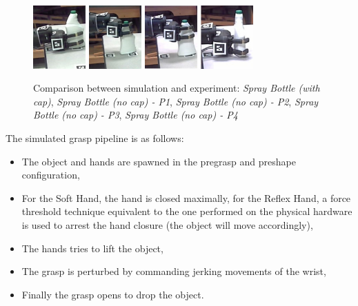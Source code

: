 \begin{figure}[!!hbt]
\begin{center}
{ \includegraphics[width=0.18\textwidth]     {images/ssoch/fig/spray_p1}    \label{spray_p1}}
{ \includegraphics[width=0.18\textwidth]     {images/ssoch/fig/spray_p2}    \label{spray_p2}}
{ \includegraphics[width=0.18\textwidth]     {images/ssoch/fig/spray_p3}    \label{spray_p3}}
{ \includegraphics[width=0.18\textwidth]     {images/ssoch/fig/spray_p4}    \label{spray_p4}}
        \caption{Comparison between simulation and experiment: \emph{Spray Bottle (with cap)}, \emph{Spray Bottle (no cap) - P1}, \emph{Spray Bottle (no cap) - P2}, \emph{Spray Bottle (no cap) - P3}, \emph{Spray Bottle (no cap) - P4}}
        \label{spray}
        \end{center}
\end{figure}




The simulated grasp pipeline is as follows:
\begin{itemize}
\item The object and hands are spawned in the pregrasp and preshape configuration,
\item For the Soft Hand, the hand is closed maximally, for the Reflex Hand, a force threshold technique equivalent to the one performed on the physical hardware is used  to arrest the hand closure (the object will move accordingly),
\item The hands tries to lift the object,
\item The grasp is perturbed by commanding jerking movements of the wrist,
\item Finally the grasp opens to drop the object.
\end{itemize}

